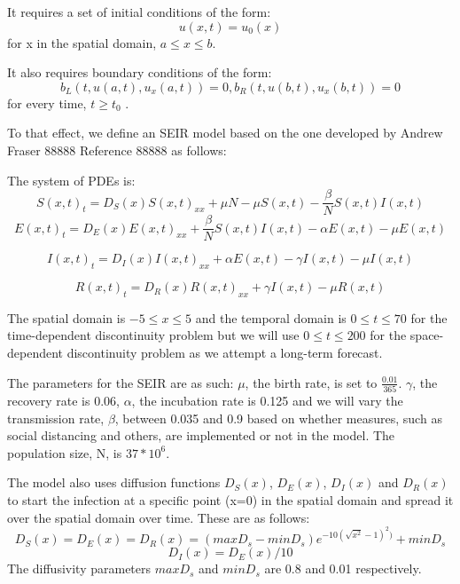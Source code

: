 \documentclass{article}
\begin{document}
It requires a set of initial conditions of the form:
\begin{equation}
u(x, t) = u_0(x)
\end{equation}
for x in the spatial domain, ${a \leq x \leq b}$.

It also requires boundary conditions of the form:
\begin{equation}
b_L(t, u(a,t), u_x(a,t)) = 0, b_R(t, u(b,t), u_x(b,t)) = 0 
\end{equation} 
for every time, $t \geq t_0$ .

To that effect, we define an SEIR model based on the one developed by Andrew Fraser 88888 Reference 88888 as follows:

The system of PDEs is:
\begin{equation}
S(x, t)_t = D_S(x)S(x, t)_{xx} + \mu N - \mu S(x, t) - \frac{\beta}{N}S(x, t)I(x, t)
\end{equation}
\begin{equation}
E(x, t)_t = D_E(x)E(x, t)_{xx} + \frac{\beta}{N}S(x, t)I(x, t) - \alpha E(x, t) - \mu E(x, t)
\end{equation}

\begin{equation}
I(x, t)_t = D_I(x)I(x, t)_{xx} + \alpha E(x, t) - \gamma I(x, t) - \mu I(x, t)
\end{equation}

\begin{equation}
R(x, t)_t = D_R(x)R(x, t)_{xx} + \gamma I(x, t) - \mu R(x, t)
\end{equation} 

The spatial domain is $-5 \leq x \leq 5$ and the temporal domain is $0 \leq t \leq 70$ for the time-dependent discontinuity problem but we will use $0 \leq t \leq 200$ for the space-dependent discontinuity problem as we attempt a long-term forecast.

The parameters for the SEIR are as such: $\mu$, the birth rate, is set to $\frac{0.01}{365}$. $\gamma$, the recovery rate is 0.06, $\alpha$, the incubation rate is 0.125 and we will vary the transmission rate, $\beta$, between 0.035 and 0.9 based on whether measures, such as social distancing and others, are implemented or not in the model. The population size, N, is $37*10^{6}$.

The model also uses diffusion functions $D_S(x)$, $D_E(x)$, $D_I(x)$ and $D_R(x)$ to start the infection at a specific point (x=0) in the spatial domain and spread it over the spatial domain over time. These are as follows:
\begin{equation}
D_S(x) = D_E(x) = D_R(x) = (maxD_s - minD_s)e^{-10(\sqrt{x^{2}} - 1)^2)} + minD_s
\end{equation} 
\begin{equation}
D_I(x) = D_E(x)/10
\end{equation}
The diffusivity parameters $maxD_s$ and $minD_s$ are 0.8 and 0.01 respectively. 
\end{document}
